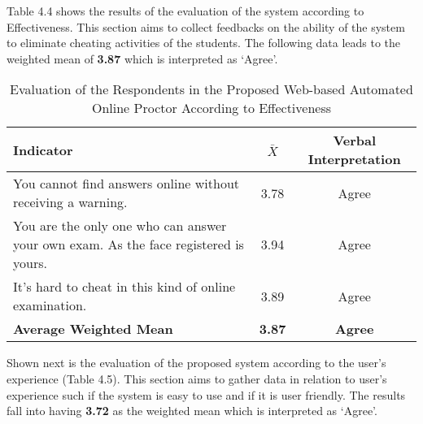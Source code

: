 Table 4.4 shows the results of the evaluation of the system according to Effectiveness.
This section aims to collect feedbacks on the ability of the system to eliminate cheating activities of the students.
The following data leads to the weighted mean of \textbf{3.87} which is interpreted as ‘Agree’.

\begin{table}[h!]
   \begin{center}
      \begin{tabular}{|m{20em}|c|c|}
         \hline
         \textbf{Indicator}                                                                  & \textbf{$\bar{X}$} & \textbf{Verbal Interpretation} \\
         \hline
         You cannot find answers online without receiving a warning.                         & 3.78               & Agree                          \\
         \hline
         You are the only one who can answer your own exam. As the face registered is yours. & 3.94               & Agree                          \\
         \hline
         It’s hard to cheat in this kind of online examination.                              & 3.89               & Agree                          \\
         \hline
         \textbf{Average Weighted Mean}                                                      & \textbf{3.87}      & \textbf{Agree}                 \\
         \hline
      \end{tabular}
   \end{center}
   \caption{Evaluation of the Respondents in the Proposed Web-based Automated Online Proctor According to Effectiveness}
\end{table}

Shown next is the evaluation of the proposed system according to the user’s experience (Table 4.5).
This section aims to gather data in relation to user’s experience such if the system is easy to use and if it is user friendly.
The results fall into having \textbf{3.72} as the weighted mean which is interpreted as ‘Agree’.

